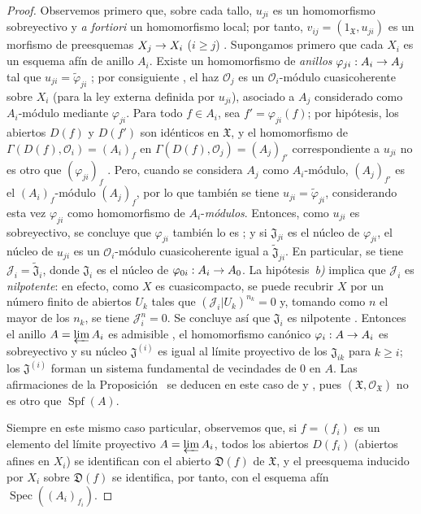 \documentclass[oneside]{amsart}
\theoremstyle{ega-env-style}
\theoremstyle{ega-thm-env-style}
\theoremstyle{ega-defn-env-style}
\def\geq{\geqslant}                 %
\renewcommand{\to}{\mathchoice{\longrightarrow}{\rightarrow}{\rightarrow}{\rightarrow}}
\begin{document}
\begin{proof}
Observemos primero que, sobre cada tallo, $u_{ji}$ es un homomorfismo sobreyectivo y \emph{a fortiori} un homomorfismo local; por tanto, $v_{ij}=(1_{\mathfrak{X}},u_{ji})$ es un morfismo de preesquemas $X_j\to X_i$ ($i\geq j$) .
Supongamos primero que cada $X_i$ es un esquema afín de anillo $A_i$.
Existe un homomorfismo de \emph{anillos} $\varphi_{ji}:A_i\to A_j$ tal que $u_{ji}=\widetilde{\varphi}_{ji}$ ; por consiguiente , el haz $\mathscr{O}_j$ es un $\mathscr{O}_i$-módulo cuasicoherente sobre $X_i$ (para la ley externa definida por $u_{ji}$), asociado a $A_j$ considerado como $A_i$-módulo mediante $\varphi_{ji}$.
Para todo $f\in A_i$, sea $f'=\varphi_{ji}(f)$; por hipótesis, los abiertos $D(f)$ y $D(f')$ son idénticos en $\mathfrak{X}$, y el homomorfismo de $\Gamma(D(f),\mathscr{O}_i)=(A_i)_f$ en $\Gamma(D(f),\mathscr{O}_j)=(A_j)_{f'}$ correspondiente a $u_{ji}$ no es otro que $(\varphi_{ji})_f$ .
Pero, cuando se considera $A_j$ como $A_i$-módulo, $(A_j)_{f'}$ es el $(A_i)_f$-módulo $(A_j)_f$, por lo que también se tiene $u_{ji}=\widetilde{\varphi}_{ji}$, considerando esta vez $\varphi_{ji}$ como homomorfismo de $A_i$-\emph{módulos}.
Entonces, como $u_{ji}$ es sobreyectivo, se concluye que $\varphi_{ji}$ también lo es ; y si $\mathfrak{J}_{ji}$ es el núcleo de $\varphi_{ji}$, el núcleo de $u_{ji}$ es un $\mathscr{O}_i$-módulo cuasicoherente igual a $\widetilde{\mathfrak{J}}_{ji}$.
En particular, se tiene $\mathscr{J}_i=\widetilde{\mathfrak{J}}_i$, donde $\mathfrak{J}_i$ es el núcleo de $\varphi_{0i}:A_i\to A_0$.
La hipótesis~\emph{b)} implica que $\mathscr{J}_i$ es \emph{nilpotente}: en efecto, como $X$ es cuasicompacto, se puede recubrir $X$ por un número finito de abiertos $U_k$ tales que $(\mathscr{J}_i|U_k)^{n_k}=0$ y, tomando como $n$ el mayor de los $n_k$, se tiene $\mathscr{J}_i^n=0$.
Se concluye así que $\mathfrak{J}_i$ es nilpotente .
Entonces el anillo $A=\varprojlim A_i$ es admisible , el homomorfismo canónico $\varphi_i:A\to A_i$ es sobreyectivo y su núcleo $\mathfrak{J}^{(i)}$ es igual al límite proyectivo de los $\mathfrak{J}_{ik}$ para $k\geq i$; los $\mathfrak{J}^{(i)}$ forman un sistema fundamental de vecindades de 0 en $A$.
Las afirmaciones de la Proposición~ se deducen en este caso de  y , pues $(\mathfrak{X},\mathscr{O}_{\mathfrak{X}})$ no es otro que $\operatorname{Spf}(A)$.

Siempre en este mismo caso particular, observemos que, si $f=(f_i)$ es un elemento del límite proyectivo $A=\varprojlim A_i$, todos los abiertos $D(f_i)$ (abiertos afines en $X_i$) se identifican con el abierto $\mathfrak{D}(f)$ de $\mathfrak{X}$, y el preesquema inducido por $X_i$ sobre $\mathfrak{D}(f)$ se identifica, por tanto, con el esquema afín $\operatorname{Spec}((A_i)_{f_i})$.


\end{proof}
\end{document}
